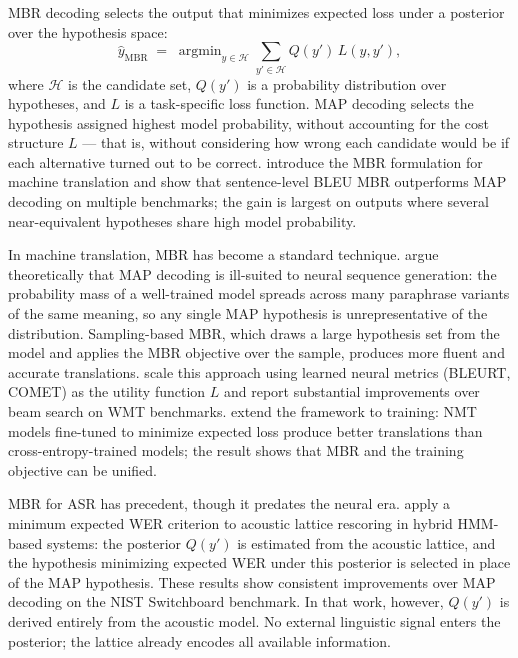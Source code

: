 MBR decoding selects the output that minimizes expected loss under a posterior over the hypothesis space:
\begin{equation*}
\hat{y}_\text{MBR} \;=\; \operatorname{argmin}_{y \in \mathcal{H}} \sum_{y' \in \mathcal{H}} Q(y') \, L(y, y'),
\end{equation*}
where $\mathcal{H}$ is the candidate set, $Q(y')$ is a probability distribution over hypotheses, and $L$ is a task-specific loss function. MAP decoding selects the hypothesis assigned highest model probability, without accounting for the cost structure $L$ — that is, without considering how wrong each candidate would be if each alternative turned out to be correct. \citet{kumar2004mbr} introduce the MBR formulation for machine translation and show that sentence-level BLEU MBR outperforms MAP decoding on multiple benchmarks; the gain is largest on outputs where several near-equivalent hypotheses share high model probability.

In machine translation, MBR has become a standard technique. \citet{eikema2020map} argue theoretically that MAP decoding is ill-suited to neural sequence generation: the probability mass of a well-trained model spreads across many paraphrase variants of the same meaning, so any single MAP hypothesis is unrepresentative of the distribution. Sampling-based MBR, which draws a large hypothesis set from the model and applies the MBR objective over the sample, produces more fluent and accurate translations. \citet{freitag2022high} scale this approach using learned neural metrics (BLEURT, COMET) as the utility function $L$ and report substantial improvements over beam search on WMT benchmarks. \citet{finkelstein2024mbr} extend the framework to training: NMT models fine-tuned to minimize expected loss produce better translations than cross-entropy-trained models; the result shows that MBR and the training objective can be unified.

MBR for ASR has precedent, though it predates the neural era. \citet{goel2000mbr} apply a minimum expected WER criterion to acoustic lattice rescoring in hybrid HMM-based systems: the posterior $Q(y')$ is estimated from the acoustic lattice, and the hypothesis minimizing expected WER under this posterior is selected in place of the MAP hypothesis. These results show consistent improvements over MAP decoding on the NIST Switchboard benchmark. In that work, however, $Q(y')$ is derived entirely from the acoustic model. No external linguistic signal enters the posterior; the lattice already encodes all available information.

